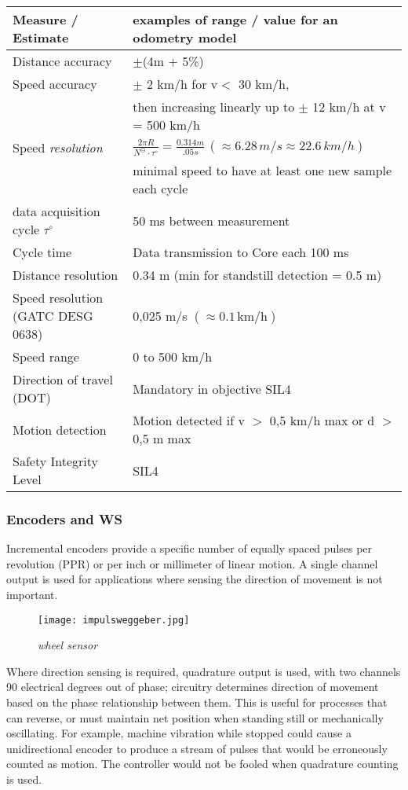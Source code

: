 \begin{tabular}{|l| l|}
\hline
Measure / Estimate  & examples of range / value for an odometry model\\
\hline
Distance accuracy & $\pm$(4m + 5\%) \\
\hline
Speed accuracy & $\pm$ 2 km/h for v$<$ 30 km/h, \\ 
&then increasing linearly up to $\pm$ 12 km/h at v = 500 km/h \\
\hline
{Speed \emph{resolution}} 
& $\frac{2\pi R}{N^\ominus\cdot \tau^\circ } = \frac{0.314 m}{.05 s}\,  (\approx 6.28\, m/s \approx 22.6\, km/h)$ \\ & minimal speed to have at least one new sample each cycle\\
\hline
data acquisition cycle $\tau^\circ$ &  50 ms between measurement \\
\hline
Cycle time  & Data transmission to Core each 100 ms\\
\hline
Distance resolution & 0.34 m (min for standstill detection = 0.5 m)\\
\hline
Speed resolution (GATC DESG 0638) & 0,025 m/s $(\approx 0.1\, \mathrm{km/h} )$ \\
\hline
Speed range & 0 to 500 km/h \\
\hline
Direction of travel (\gls{DOT}) &Mandatory in objective SIL4\\
\hline
 Motion detection & Motion detected if v $>$ 0,5 km/h max or d $>$ 0,5 m max \\
\hline
 Safety Integrity Level & SIL4\\
\hline

\end{tabular}

\subsubsection{Encoders and \gls{WS}}

Incremental encoders provide a specific number of equally spaced pulses per revolution (PPR) or per inch or millimeter of linear motion. A single channel output is used for applications where sensing the direction of movement is not important. 
\begin{figure}[ht!]
\centerline{
\texttt{[image: impulsweggeber.jpg]}
}
\caption{\emph{wheel sensor}}
\label {fig:wsens}
\end{figure}
Where direction sensing is required, quadrature output is used, with two channels 90 electrical degrees out of phase; circuitry determines direction of movement based on the phase relationship between them. This is useful for processes that can reverse, or must maintain net position when standing still or mechanically oscillating. For example, machine vibration while stopped could cause a unidirectional encoder to produce a stream of pulses that would be erroneously counted as motion. The controller would not be fooled when quadrature counting is used.


